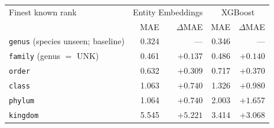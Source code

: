 \begin{tabular}{lrrrr}
\toprule
Finest known rank & \multicolumn{2}{c}{Entity Embeddings} & \multicolumn{2}{c}{XGBoost} \\
 & MAE & $\Delta$MAE & MAE & $\Delta$MAE \\
\midrule
\texttt{genus} (species unseen; baseline) & 0.324 & --- & 0.346 & --- \\
\texttt{family} (genus $=$ UNK) & 0.461 & $+0.137$ & 0.486 & $+0.140$ \\
\texttt{order} & 0.632 & $+0.309$ & 0.717 & $+0.370$ \\
\texttt{class} & 1.063 & $+0.740$ & 1.326 & $+0.980$ \\
\texttt{phylum} & 1.064 & $+0.740$ & 2.003 & $+1.657$ \\
\texttt{kingdom} & 5.545 & $+5.221$ & 3.414 & $+3.068$ \\
\bottomrule
\end{tabular}
